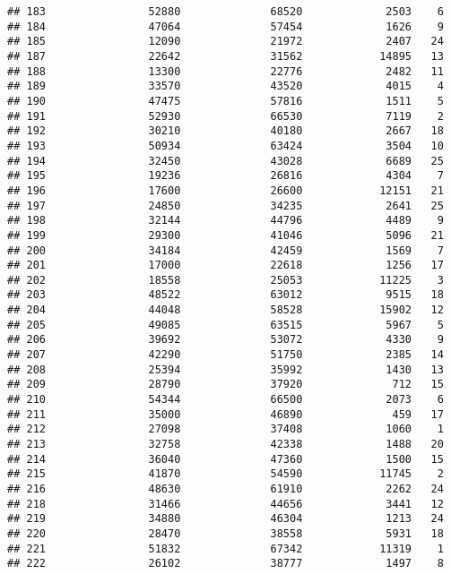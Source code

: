 \documentclass[
]{article}
\begin{document}
\begin{verbatim}
## 183                52880              68520             2503    6
## 184                47064              57454             1626    9
## 185                12090              21972             2407   24
## 187                22642              31562            14895   13
## 188                13300              22776             2482   11
## 189                33570              43520             4015    4
## 190                47475              57816             1511    5
## 191                52930              66530             7119    2
## 192                30210              40180             2667   18
## 193                50934              63424             3504   10
## 194                32450              43028             6689   25
## 195                19236              26816             4304    7
## 196                17600              26600            12151   21
## 197                24850              34235             2641   25
## 198                32144              44796             4489    9
## 199                29300              41046             5096   21
## 200                34184              42459             1569    7
## 201                17000              22618             1256   17
## 202                18558              25053            11225    3
## 203                48522              63012             9515   18
## 204                44048              58528            15902   12
## 205                49085              63515             5967    5
## 206                39692              53072             4330    9
## 207                42290              51750             2385   14
## 208                25394              35992             1430   13
## 209                28790              37920              712   15
## 210                54344              66500             2073    6
## 211                35000              46890              459   17
## 212                27098              37408             1060    1
## 213                32758              42338             1488   20
## 214                36040              47360             1500   15
## 215                41870              54590            11745    2
## 216                48630              61910             2262   24
## 218                31466              44656             3441   12
## 219                34880              46304             1213   24
## 220                28470              38558             5931   18
## 221                51832              67342            11319    1
## 222                26102              38777             1497    8

\end{verbatim}
\end{document}
